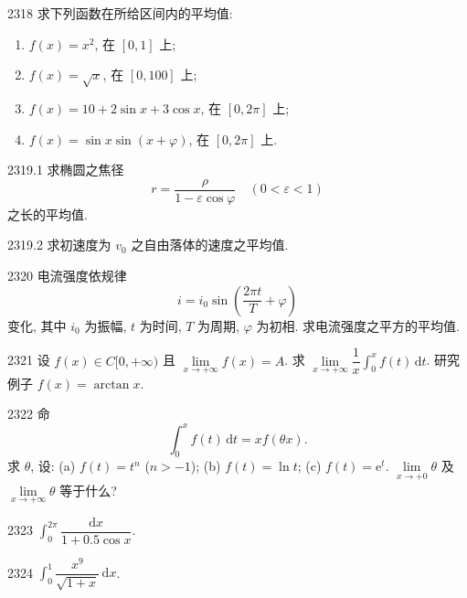 \begin{prob}[L]{2318}
求下列函数在所给区间内的平均值:
\begin{enumerate}[label=(\alph*), itemsep=2pt, topsep=3pt]
  \item $f(x) = x^2$, 在 $[0, 1]$ 上;
  \item $f(x) = \sqrt{x}$, 在 $[0, 100]$ 上;
  \item $f(x) = 10 + 2\sin x + 3\cos x$, 在 $[0, 2\pi]$ 上;
  \item $f(x) = \sin x\sin(x + \varphi)$, 在 $[0, 2\pi]$ 上.
\end{enumerate}
\end{prob}

\begin{prob}[M]{2319.1}
求椭圆之焦径
\[
r = \frac{\rho}{1 - \varepsilon\cos\varphi} \quad (0 < \varepsilon < 1)
\]
之长的平均值.
\end{prob}

\begin{prob}[S]{2319.2}
求初速度为 $v_0$ 之自由落体的速度之平均值.
\end{prob}

\begin{prob}[M]{2320}
电流强度依规律
\[
i = i_0 \sin\left(\frac{2\pi t}{T} + \varphi\right)
\]
变化, 其中 $i_0$ 为振幅, $t$ 为时间, $T$ 为周期, $\varphi$ 为初相. 求电流强度之平方的平均值.
\end{prob}

\begin{prob}[M]{2321}
设 $f(x) \in C[0, +\infty)$ 且 $\lim\limits_{x\to+\infty} f(x) = A$. 求 $\lim\limits_{x\to+\infty} \dfrac{1}{x}\int_{0}^{x} f(t)\,\mathrm{d}t$. 研究例子 $f(x) = \arctan x$.
\end{prob}

\begin{prob}[L]{2322}
命
\[
\int_{0}^{x} f(t)\,\mathrm{d}t = x f(\theta x).
\]
求 $\theta$, 设: (a) $f(t) = t^n$ ($n > -1$); (b) $f(t) = \ln t$; (c) $f(t) = \mathrm{e}^t$. $\lim\limits_{x\to+0} \theta$ 及 $\lim\limits_{x\to+\infty} \theta$ 等于什么?
\end{prob}


\begin{prob}[S]{2323}
$\int_{0}^{2\pi} \dfrac{\mathrm{d}x}{1 + 0.5\cos x}$.
\end{prob}

\begin{prob}[S]{2324}
$\int_{0}^{1} \dfrac{x^9}{\sqrt{1 + x}}\,\mathrm{d}x$.
\end{prob}

